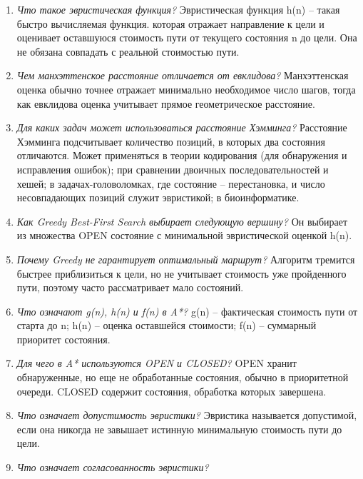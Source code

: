 \begin{enumerate}
	\item \textit{Что такое эвристическая функция?}\newline
	Эвристическая функция h(n) -- такая быстро вычисляемая функция. которая отражает направление к цели и  оценивает оставшуюся стоимость пути от текущего состояния n до цели. 
	Она не обязана совпадать с реальной стоимостью пути.
	\item \textit{Чем манхэттенское расстояние отличается от евклидова?}\newline
	Манхэттенская оценка обычно точнее отражает минимально необходимое число шагов, тогда как евклидова оценка учитывает прямое геометрическое расстояние.
	\item \textit{Для каких задач может использоваться расстояние Хэмминга?}\newline
	Расстояние Хэмминга подсчитывает количество позиций, в которых два состояния отличаются. Может применяться в теории кодирования (для обнаружения и исправления ошибок); при сравнении двоичных последовательностей и хешей; в задачах-головоломках, где состояние -- перестановка, и число несовпадающих позиций служит эвристикой; в биоинформатике.
	\item \textit{Как Greedy Best-First Search выбирает следующую вершину?}\newline
	Он выбирает из множества OPEN состояние с минимальной эвристической оценкой h(n).
	\item \textit{Почему Greedy не гарантирует оптимальный маршрут?}\newline
	Алгоритм тремится быстрее приблизиться к цели, но не учитывает стоимость уже пройденного пути, поэтому часто рассматривает мало состояний.
	\item \textit{Что означают g(n), h(n) и f(n) в A*?}\newline
	g(n) -- фактическая стоимость пути от старта до n; 
	h(n) -- оценка оставшейся стоимости; 
	f(n) -- суммарный приоритет состояния.
	\item \textit{Для чего в A* используются OPEN и CLOSED?}\newline
	OPEN хранит обнаруженные, но еще не обработанные состояния, обычно в приоритетной очереди. 
	CLOSED содержит состояния, обработка которых завершена.
	\item \textit{Что означает допустимость эвристики?}\newline
	Эвристика называется допустимой, если она никогда не завышает истинную минимальную стоимость пути до цели.
	\item \textit{Что означает согласованность эвристики?}\newline

\end{enumerate}
